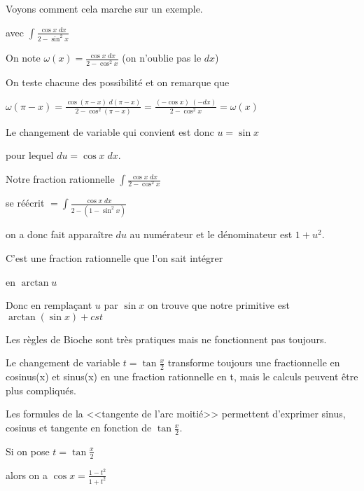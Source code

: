 \change

Voyons comment cela marche sur un exemple.

avec $\int \frac{\cos x \; dx}{2-\sin^2 x}$

\change

On note $\omega(x)= \frac{\cos x \; dx}{2-\cos^2 x}$ (on n'oublie pas le $dx$)

\change

On teste chacune des possibilité et on remarque que 


$\omega(\pi-x)=\frac{\cos(\pi-x) \; d(\pi-x)}{2-\cos^2 (\pi-x)} = \frac{(-\cos x) \; (-dx)}{2-\cos^2 x} 
= \omega(x)$

\change

Le changement de variable qui convient est donc $u = \sin x$

\change

pour lequel $du= \cos x \; dx$. 

\change

Notre fraction rationnelle 
$\int \frac{\cos x \; dx}{2-\cos^2 x}$

\change

se réécrit $= \int \frac{\cos x \; dx}{2-(1-\sin^2 x)}$

\change

on a donc fait apparaître $du$ au numérateur et le dénominateur est 
$1+u^2$.


\change

C'est une fraction rationnelle que l'on sait intégrer 

en $\arctan u$

\change

Donc en remplaçant $u$ par $\sin x$ on trouve que notre primitive est 
$\arctan (\sin x) + cst$

\diapo


Les règles de Bioche sont très pratiques mais ne fonctionnent pas toujours.

Le changement de variable $t=\tan \frac x2$
transforme toujours une fractionnelle en cosinus(x) et sinus(x) en une fraction rationnelle en t,
mais le calculs peuvent être plus compliqués.

\change


Les formules de la <<tangente de l'arc moitié>> permettent d'exprimer sinus, cosinus et tangente
en fonction de $\tan \frac x2$. 

Si on pose $ t=\tan \frac{x}{2}$  

alors on a 
$\cos x = \frac {1-t^2}{1+t^2}$

